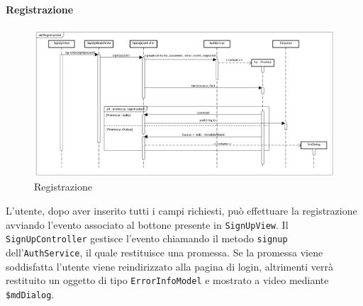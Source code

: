 \paragraph{Registrazione}

\label{Registrazione}

\begin{figure}[ht]
	\centering
	\includegraphics[scale=0.35,keepaspectratio]{UML/DiagrammiDiSequenza/Front-end/SignUp.png}
	\caption{Registrazione}
\end{figure} \FloatBarrier

L'utente, dopo aver inserito tutti i campi richiesti, può effettuare la registrazione avviando l'evento associato al bottone presente in \texttt{SignUpView}. Il \texttt{SignUpController} gestisce l'evento chiamando il metodo \texttt{signup} dell'\texttt{AuthService}, il quale restituisce una promessa. Se la promessa viene soddisfatta l'utente viene reindirizzato alla pagina di login, altrimenti verrà restituito un oggetto di tipo \texttt{ErrorInfoModel} e mostrato a video mediante \texttt{\$mdDialog}.